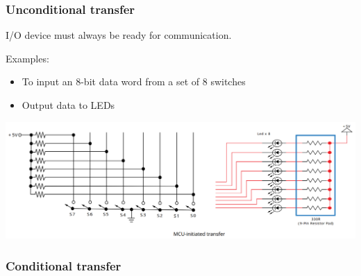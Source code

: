 \documentclass[11pt]{article}
\begin{document}
\subsubsection{Unconditional transfer}
\label{sec:org86691ef}
I/O device must always be ready for communication.

Examples:
\begin{itemize}
\item To input an 8-bit data word from a set of 8 switches
\item Output data to LEDs
\end{itemize}

\begin{center}
\includegraphics[width=.9\linewidth]{./images/unconditional-transfer-diagram.png}
\end{center}
\subsubsection{Conditional transfer}
\label{sec:orge2e21e2}
\end{document}
